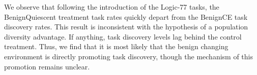 \documentclass[PhD]{msu-thesis}
\begin{document}
We observe that following the introduction of the Logic-77 tasks, the BenignQuiescent treatment task rates quickly depart from the BenignCE task discovery rates. This result is inconsistent with the hypothesis of a population diversity advantage. If anything, task discovery levels lag behind the control treatment. Thus, we find that it is most likely that the benign changing environment is directly promoting task discovery, though the mechanism of this promotion remains unclear.  

\end{document}
